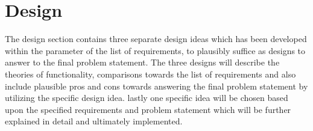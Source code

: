 \section{Design}
The design section contains three separate design ideas which has been developed within the parameter of the list of requirements, to plausibly suffice as designs to answer to the final problem statement. The three designs will describe the theories of functionality, comparisons towards the list of requirements and also include plausible pros and cons towards answering the final problem statement by utilizing the specific design idea.
lastly one specific idea will be chosen based upon the specified requirements and problem statement which will be further explained in detail and ultimately implemented. 





